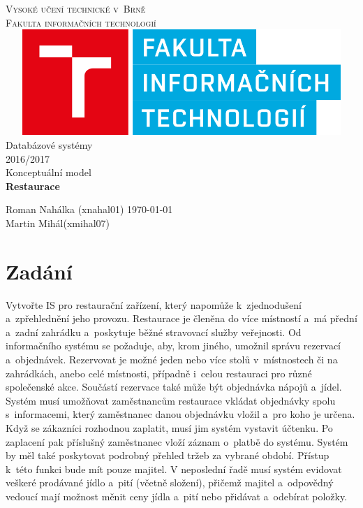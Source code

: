\documentclass[a4paper, 12pt]{article}
\begin{document}
\begin{titlepage}
\begin{center}
{\Huge \textsc{Vysoké učení technické v~Brně}\\ \huge \textsc{Fakulta informačních technologií\\}}
\includegraphics[width=135mm, height=40mm]{logo.png}\\
{\LARGE Databázové systémy\\2016/2017\\Konceptuální model\\ \Huge \textbf{Restaurace}}
\end{center}
{\Large Roman Nahálka (xnahal01) \hfill \today \\Martin Mihál(xmihal07)}
\end{titlepage}
\section{Zadání}
Vytvořte IS pro restaurační zařízení, který napomůže k~zjednodušení a~zpřehlednění jeho provozu. Restaurace je členěna do více místností a~má přední a~zadní zahrádku a~poskytuje běžné stravovací služby veřejnosti. Od informačního systému se požaduje, aby, krom jiného, umožnil správu rezervací a~objednávek. Rezervovat je možné jeden nebo více stolů v~místnostech či na zahrádkách, anebo celé místnosti, případně i~celou restauraci pro různé společenské akce. Součástí rezervace také může být objednávka nápojů a~jídel. Systém musí umožňovat zaměstnancům restaurace vkládat objednávky spolu s~informacemi, který zaměstnanec danou objednávku vložil a~pro koho je určena. Když se zákazníci rozhodnou zaplatit, musí jim systém vystavit účtenku. Po zaplacení pak příslušný zaměstnanec vloží záznam o~platbě do systému. Systém by měl také poskytovat podrobný přehled tržeb za vybrané období. Přístup k~této funkci bude mít pouze majitel. V neposlední řadě musí systém evidovat veškeré prodávané jídlo a~pití (včetně složení), přičemž majitel a~odpovědný vedoucí mají možnost měnit ceny jídla a~pití nebo přidávat a~odebírat položky.
\newpage
\end{document}

